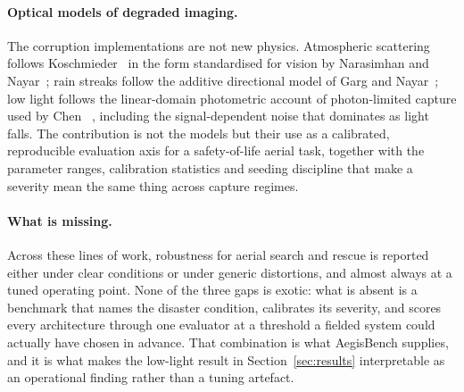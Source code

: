 \paragraph{Optical models of degraded imaging.}
The corruption implementations are not new physics. Atmospheric
scattering follows Koschmieder~\cite{koschmieder1924theorie} in the form
standardised for vision by Narasimhan and
Nayar~\cite{narasimhan2002vision}; rain streaks follow the additive
directional model of Garg and Nayar~\cite{garg2007rain}; low light
follows the linear-domain photometric account of photon-limited capture
used by Chen \etal~\cite{chen2018dark}, including the signal-dependent
noise that dominates as light falls. The contribution is not the models
but their use as a calibrated, reproducible evaluation axis for a
safety-of-life aerial task, together with the parameter ranges,
calibration statistics and seeding discipline that make a severity mean
the same thing across capture regimes.

\paragraph{What is missing.}
Across these lines of work, robustness for aerial search and rescue is
reported either under clear conditions or under generic distortions, and
almost always at a tuned operating point. None of the three gaps is
exotic: what is absent is a benchmark that names the disaster condition,
calibrates its severity, and scores every architecture through one
evaluator at a threshold a fielded system could actually have chosen in
advance. That combination is what AegisBench supplies, and it is what
makes the low-light result in Section~\ref{sec:results} interpretable as
an operational finding rather than a tuning artefact.
